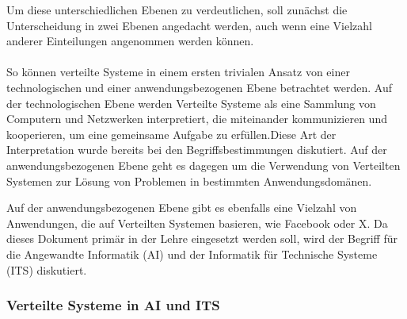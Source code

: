 \documentclass[../vs-script-first-v01.tex]{subfiles}
\begin{document}
Um diese unterschiedlichen Ebenen zu verdeutlichen, soll zunächst die Unterscheidung in zwei Ebenen angedacht werden, auch wenn eine Vielzahl anderer Einteilungen angenommen werden können.
\\\\
So können verteilte Systeme in einem ersten trivialen Ansatz von einer technologischen und einer anwendungsbezogenen Ebene betrachtet werden\cite{coulouris2012distributed}. Auf der technologischen Ebene werden Verteilte Systeme als eine Sammlung von Computern und Netzwerken interpretiert, die miteinander kommunizieren und kooperieren, um eine gemeinsame Aufgabe zu erfüllen.Diese Art der Interpretation wurde bereits bei den Begriffsbestimmungen diskutiert. Auf der anwendungsbezogenen Ebene geht es dagegen um die Verwendung von Verteilten Systemen zur Lösung von Problemen in bestimmten Anwendungsdomänen.

Auf der anwendungsbezogenen Ebene gibt es ebenfalls eine Vielzahl von Anwendungen, die auf Verteilten Systemen basieren, wie Facebook oder X. 
Da dieses Dokument primär in der Lehre eingesetzt werden soll, wird der Begriff für die Angewandte Informatik (AI) und der Informatik für Technische Systeme (ITS) diskutiert.

\subsubsection{Verteilte Systeme in AI und ITS}
\end{document}
